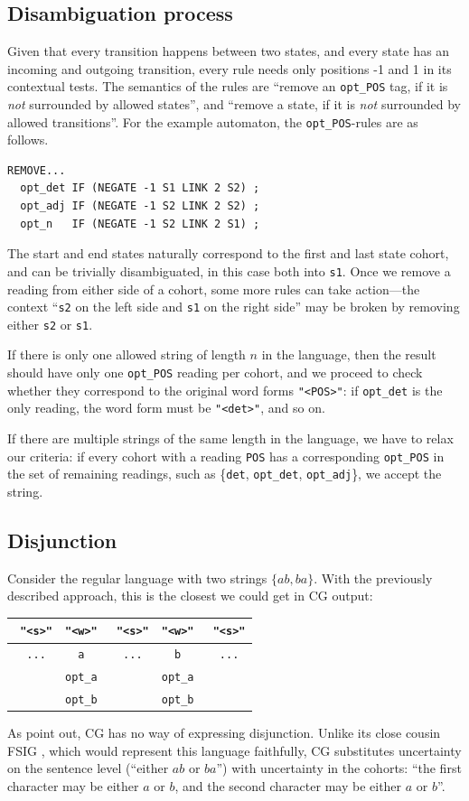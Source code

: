 \documentclass[11pt]{article}
\def\t#1{\texttt{#1}}
\def\h#1{{\tt \color{gray} #1}}
\def\swf{\h{"<s>"}}
\begin{document}
\subsection{Disambiguation process}
Given that every transition happens between two states, and every state 
has an incoming and outgoing transition, every rule needs only
positions -1 and 1 in its contextual tests. 
The semantics of the rules are ``remove an \t{opt\_POS} tag, if it is 
\emph{not} surrounded by allowed states'',
and ``remove a state, if it is \emph{not} surrounded by allowed transitions''.
For the example automaton, the \t{opt\_POS}-rules are as follows.
\begin{verbatim}
REMOVE...
  opt_det IF (NEGATE -1 S1 LINK 2 S2) ;
  opt_adj IF (NEGATE -1 S2 LINK 2 S2) ;
  opt_n   IF (NEGATE -1 S2 LINK 2 S1) ;
\end{verbatim}
\noindent The start and end states naturally correspond to the first and last
state cohort, and can be trivially disambiguated, in this case both into \t{s1}.
Once we remove a reading from either side of a cohort, some more rules can take
action---the context ``\t{s2} on the left side and \t{s1} on the right side''
may be broken by removing either \t{s2} or \t{s1}. 

If there is only one allowed string of length $n$ in the language, then the
result should have only one \t{opt\_POS} reading per cohort, and we proceed to
check whether they correspond to the original word forms \t{"<POS>"}: if
\t{opt\_det} is the only reading, the word form must be \t{"<det>"}, and so on.

If there are multiple strings of the same length in the language, we have to
relax our criteria: if every cohort with a reading \t{POS} has a corresponding
\t{opt\_POS} in the set of remaining readings, such as \{\t{det}, \t{opt\_det},
\t{opt\_adj}\}, we accept the string.


\subsection{Disjunction}
Consider the regular language with two strings $\{ab,ba\}$. With the previously
described approach, this is the closest we could get in CG output:
\begin{table}[h]
  \centering\small
  \begin{tabular}{c|c|c|c|c}
    \swf    & \t{"<w>"}  & \swf    & \t{"<w>"}  & \swf    \\ \hline
    \h{...} & \t{a}      & \h{...} & \t{b}      & \h{...} \\ 
            & \t{opt\_a} &         & \t{opt\_a} &         \\            
            & \t{opt\_b} &         & \t{opt\_b} &
  \end{tabular}
\end{table}
As  point out, CG has no way of expressing disjunction.
Unlike its close cousin FSIG \cite{koskenniemi90}, which would represent this
language faithfully, CG substitutes uncertainty on the sentence level (``either
$ab$ or $ba$'') with uncertainty in the cohorts: ``the first character may be
either $a$ or $b$, and the second character may be either $a$ or $b$''.
\end{document}
